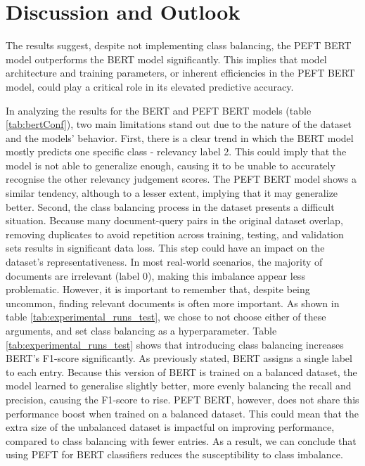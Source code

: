 \documentclass[sigconf, natbib=true]{acmart}
\begin{document}
\section{Discussion and Outlook}
The results suggest, despite not implementing class balancing, the PEFT BERT model outperforms the BERT model significantly. This implies that model architecture and training parameters, or inherent efficiencies in the PEFT BERT model, could play a critical role in its elevated predictive accuracy.

In analyzing the results for the BERT and PEFT BERT models (table \ref{tab:bertConf}), two main limitations stand out due to the nature of the dataset and the models' behavior.
First, there is a clear trend in which the BERT model mostly predicts one specific class - relevancy label 2. 
This could imply that the model is not able to generalize enough, causing it to be unable to accurately recognise the other relevancy judgement scores. 
The PEFT BERT model shows a similar tendency, although to a lesser extent, implying that it may generalize better. 
Second, the class balancing process in the dataset presents a difficult situation. 
Because many document-query pairs in the original dataset overlap, removing duplicates to avoid repetition across training, testing, and validation sets results in significant data loss. 
This step could have an impact on the dataset's representativeness. 
In most real-world scenarios, the majority of documents are irrelevant (label 0), making this imbalance appear less problematic. 
However, it is important to remember that, despite being uncommon, finding relevant documents is often more important. 
As shown in table \ref{tab:experimental_runs_test}, we chose to not choose either of these arguments, and set class balancing as a hyperparameter. 
Table \ref{tab:experimental_runs_test} shows that introducing class balancing increases BERT's F1-score significantly. 
As previously stated, BERT assigns a single label to each entry. 
Because this version of BERT is trained on a balanced dataset, the model learned to generalise slightly better, more evenly balancing the recall and precision, causing the F1-score to rise. 
PEFT BERT, however, does not share this performance boost when trained on a balanced dataset. 
This could mean that the extra size of the unbalanced dataset is impactful on improving performance, compared to class balancing with fewer entries. 
As a result, we can conclude that using PEFT for BERT classifiers reduces the susceptibility to class imbalance.
\end{document}
